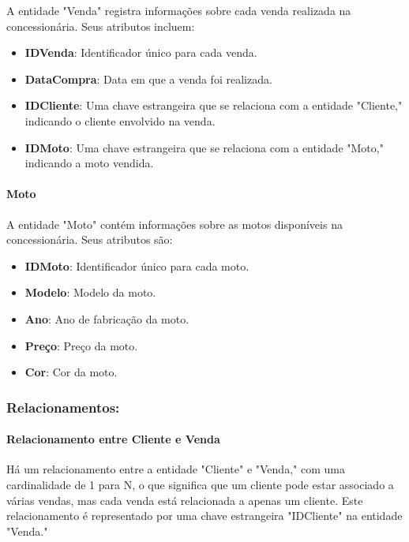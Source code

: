 A entidade "Venda" registra informações sobre cada venda realizada na concessionária. Seus atributos incluem:

\begin{itemize}
	\item \textbf{IDVenda}: Identificador único para cada venda.
	\item \textbf{DataCompra}: Data em que a venda foi realizada.
	\item \textbf{IDCliente}: Uma chave estrangeira que se relaciona com a entidade "Cliente," indicando o cliente envolvido na venda.
	\item \textbf{IDMoto}: Uma chave estrangeira que se relaciona com a entidade "Moto," indicando a moto vendida.
\end{itemize}

\paragraph{Moto}

A entidade "Moto" contém informações sobre as motos disponíveis na concessionária. Seus atributos são:

\begin{itemize}
	\item \textbf{IDMoto}: Identificador único para cada moto.
	\item \textbf{Modelo}: Modelo da moto.
	\item \textbf{Ano}: Ano de fabricação da moto.
	\item \textbf{Preço}: Preço da moto.
	\item \textbf{Cor}: Cor da moto.
\end{itemize}

\subsubsection{Relacionamentos:}


\paragraph{Relacionamento entre Cliente e Venda}

Há um relacionamento entre a entidade "Cliente" e "Venda," com uma cardinalidade de 1 para N, o que significa que um cliente pode estar associado a várias vendas, mas cada venda está relacionada a apenas um cliente. Este relacionamento é representado por uma chave estrangeira "IDCliente" na entidade "Venda."

